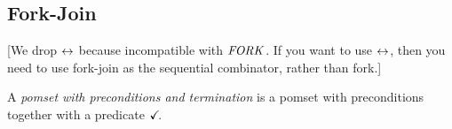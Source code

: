 \begin{comment}
\begin{gather*}
  \PR{x}{r} \SEMI
  \PW{y}{r}
  \\
  \hbox{\begin{tikzinline}[node distance=.5em and 1.5em]
      \xform{xdi}{((1{=}r)\limplies\aForm[r/x][r/y])\land \lnot\Q{}}{}
      \xform{xid}{((x{=}r\lor1{=}r)\limplies\aForm[r/x][r/y])\land \lnot\Q{}}{below right=.5em and -4em of xdi}
      \event{a1}{\DR{x}{1}}{above=of xdi}
      \event{a2}{((x{=}r\lor1{=}r)\limplies r{=}1) \land\lnot\Q{}\mid\DW{y}{1}}{above=2.7em of xid}
      \xform{xdd}{((1{=}r)\limplies\aForm[r/x][r/y])\land (\Q{}\limplies r{=}1)}{above right=.5em and -1em of a1}
      \xform{xii}{((x{=}r\lor1{=}r)\limplies\aForm[r/x][r/y])\land \lnot\Q{}}{below=of xid}
      \xo{a1}{xdi}
      \xo{a2}{xid}
      \xo{a1}{xdd}
      \xo{a2}{xdd}
    \end{tikzinline}}
\end{gather*}
With order:
\begin{gather*}
  \hbox{\begin{tikzinline}[node distance=.5em and 1.5em]
      \event{a1}{\DR{x}{1}}{}
      \event{a2}{1{=}r\limplies r{=}1\mid\DW{y}{1}}{right=of a1}
      \po{a1}{a2}
    \end{tikzinline}}
\end{gather*}
\end{comment}



\subsection{Fork-Join}

[We drop $\mathrel\leftrightarrow$ because incompatible with $\sFORK{}$.  If you want to use
$\mathrel\leftrightarrow$, then you need to use fork-join as the sequential combinator,
rather than fork.]

\begin{definition}
  A \emph{pomset with preconditions and termination} is
  a pomset with preconditions together with a predicate $\checkmark\!$.
\end{definition}



